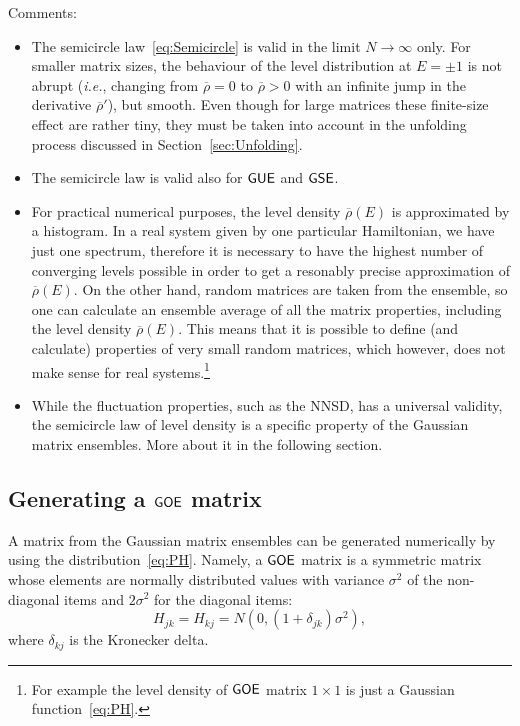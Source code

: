 \documentclass[a4paper,11pt,twoside]{article}
\begin{document}
        Comments:
        \begin{itemize}
            \item 
                The semicircle law~\eqref{eq:Semicircle} is valid in the limit $N\rightarrow\infty$ only.
                For smaller matrix sizes, the behaviour of the level distribution at $E=\pm1$ is not abrupt (\emph{i.e.}, changing from $\overline{\rho}=0$ to $\overline{\rho}>0$ with an infinite jump in the derivative $\overline{\rho}'$), but smooth.
                Even though for large matrices these finite-size effect are rather tiny, they must be taken into account in the unfolding process discussed in Section~\ref{sec:Unfolding}.

            \item The semicircle law is valid also for $\mathsf{GUE}$ and $\mathsf{GSE}$. 
        
            \item 
                For practical numerical purposes, the level density $\overline{\rho}(E)$ is approximated by a histogram.
                In a real system given by one particular Hamiltonian, we have just one spectrum, therefore it is necessary to have the highest number of converging levels possible in order to get a resonably precise approximation of $\overline{\rho}(E)$.
                On the other hand, random matrices are taken from the ensemble, so one can calculate an ensemble average of all the matrix properties, including the level density $\overline{\rho}(E)$.
                This means that it is possible to define (and calculate) properties of very small random matrices, which however, does not make sense for real systems.\footnote{
                    For example the level density of $\mathsf{GOE}$ matrix $1\times1$ is just a Gaussian function~\eqref{eq:PH}.
                }

            \item 
                While the fluctuation properties, such as the NNSD, has a universal validity, the semicircle law of level density is a specific property of the Gaussian matrix ensembles.
                More about it in the following section.
        \end{itemize}

    \subsection{Generating a $\mathsf{GOE}$ matrix}
        A matrix from the Gaussian matrix ensembles can be generated numerically by using the distribution~\eqref{eq:PH}.
        Namely, a $\mathsf{GOE}$ matrix is a symmetric matrix whose elements are normally distributed values with variance $\sigma^{2}$ of the non-diagonal items and $2\sigma^{2}$ for the diagonal items:
        \begin{equation}
            H_{jk}=H_{kj}=N\left(0,(1+\delta_{jk})\sigma^{2}\right),
        \end{equation}
        where $\delta_{kj}$ is the Kronecker delta. 
\end{document}
